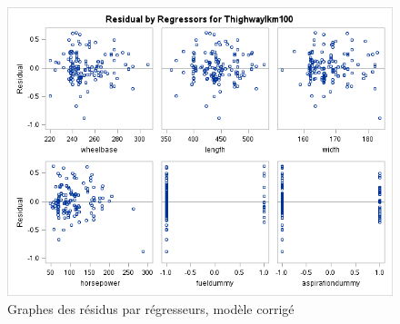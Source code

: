 \documentclass[11pt,a4paper]{article}
\begin{document}
\begin{figure}
	\centering
	\includegraphics[width=0.8\linewidth]{resbyregressorscorr}
	\caption{Graphes des résidus par régresseurs, modèle corrigé}
	\label{fig:regressorscorr}
\end{figure}
\end{document}
